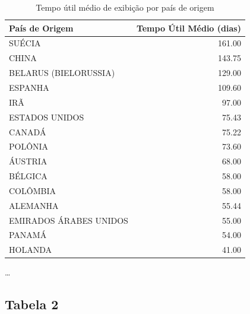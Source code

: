 \documentclass{article}
\begin{document}
\begin{table}[H]
\centering
\caption{Tempo útil médio de exibição por país de origem}
\begin{small}
\begin{tabular}{l r}
\hline
\textbf{País de Origem} & \textbf{Tempo Útil Médio (dias)} \\
\hline
SUÉCIA & 161.00 \\
CHINA & 143.75 \\
BELARUS (BIELORUSSIA) & 129.00 \\
ESPANHA & 109.60 \\
IRÃ & 97.00 \\
ESTADOS UNIDOS & 75.43 \\
CANADÁ & 75.22 \\
POLÔNIA & 73.60 \\
ÁUSTRIA & 68.00 \\
BÉLGICA & 58.00 \\
COLÔMBIA & 58.00 \\
ALEMANHA & 55.44 \\
EMIRADOS ÁRABES UNIDOS & 55.00 \\
PANAMÁ & 54.00 \\
HOLANDA & 41.00 \\
\end{tabular}
\end{small}

\begin{center}
\small
\ldots
\end{center}

\end{table}
 
\lipsum[1] %

\pagebreak
\subsection*{Tabela 2}
\end{document}
